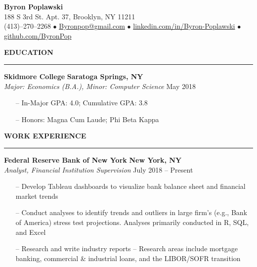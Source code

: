 \documentclass[paper=a4, fontsize=11pt]{scrartcl} %
\newcommand{\I}{--}
\newenvironment{mycenter}[1][\topsep]
{\setlength{\topsep}{#1}\par\kern\topsep\centering}%
{\par\kern\topsep}%
\newcommand*{\email}[1]{%
  \normalsize\href{mailto:#1}{#1}}
\begin{document}
 
\begin{mycenter}
\textbf{\LARGE Byron Poplawski} \\
188 S 3rd St. Apt. 37, Brooklyn, NY 11211 \\
(413)--270--2268 $\bullet$ \email{Byronpop@gmail.com} $\bullet$ \href{https://www.linkedin.com/in/byron-poplawski}{linkedin.com/in/Byron-Poplawski} $\bullet$ \href{https://github.com/ByronPop}{github.com/ByronPop}
\end{mycenter}


\begin{mycenter}[0pt]

\textsc{\textbf{EDUCATION}}

\end{mycenter}
\vspace{-3mm}

\rule{\textwidth}{0.4pt}
\textbf{Skidmore College} \hfill  \textbf{Saratoga Springs, NY} \\
\textit{Major: Economics (B.A.), Minor: Computer Science} \hfill May 2018
\begin{itemize}[topsep=0pt,noitemsep]
    \item[\I]In-Major GPA: 4.0; Cumulative GPA: 3.8
    \item[\I]Honors: Magna Cum Laude; Phi Beta Kappa

\end{itemize}

\vspace{2mm}

\begin{mycenter}[0pt]

\textsc{\textbf{WORK EXPERIENCE}}

\end{mycenter}

\vspace{-3mm}

\rule{\textwidth}{0.4pt}

\textbf{Federal Reserve Bank of New York} \hfill \textbf{New York, NY} \\
\textit{Analyst, Financial Institution Supervision} \hfill July 2018 -- Present

\begin{itemize}[topsep=0pt,noitemsep]

                 \item[\I] Develop Tableau dashboards to visualize bank balance sheet and financial market trends
                 
                  \item[\I] Conduct analyses to identify trends and outliers in large firm's (e.g., Bank of America) stress test projections. Analyses primarily conducted in R, SQL, and Excel

                \item[\I] Research and write industry reports -- Research areas include mortgage banking, commercial \& industrial loans, and the LIBOR/SOFR transition
                
                

\end{itemize}
\end{document}
